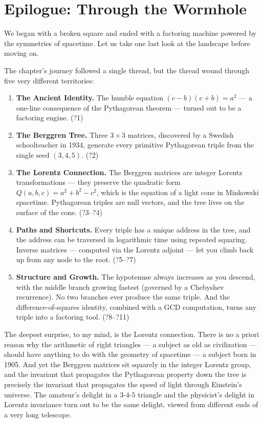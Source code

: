 \bigskip


\section{Epilogue: Through the Wormhole}

We began with a broken square and ended with a factoring machine powered by the symmetries of spacetime. Let us take one last look at the landscape before moving on.

The chapter's journey followed a single thread, but the thread wound through five very different territories:

\begin{enumerate}
\item \textbf{The Ancient Identity.} The humble equation $(c - b)(c + b) = a^2$ --- a one-line consequence of the Pythagorean theorem --- turned out to be a factoring engine. (?1)
\item \textbf{The Berggren Tree.} Three $3 \times 3$ matrices, discovered by a Swedish schoolteacher in 1934, generate every primitive Pythagorean triple from the single seed $(3, 4, 5)$. (?2)
\item \textbf{The Lorentz Connection.} The Berggren matrices are integer Lorentz transformations --- they preserve the quadratic form $Q(a, b, c) = a^2 + b^2 - c^2$, which is the equation of a light cone in Minkowski spacetime. Pythagorean triples are null vectors, and the tree lives on the surface of the cone. (?3--?4)
\item \textbf{Paths and Shortcuts.} Every triple has a unique address in the tree, and the address can be traversed in logarithmic time using repeated squaring. Inverse matrices --- computed via the Lorentz adjoint --- let you climb back up from any node to the root. (?5--?7)
\item \textbf{Structure and Growth.} The hypotenuse always increases as you descend, with the middle branch growing fastest (governed by a Chebyshev recurrence). No two branches ever produce the same triple. And the difference-of-squares identity, combined with a GCD computation, turns any triple into a factoring tool. (?8--?11)
\end{enumerate}
The deepest surprise, to my mind, is the Lorentz connection. There is no a priori reason why the arithmetic of right triangles --- a subject as old as civilization --- should have anything to do with the geometry of spacetime --- a subject born in 1905. And yet the Berggren matrices sit squarely in the integer Lorentz group, and the invariant that propagates the Pythagorean property down the tree is precisely the invariant that propagates the speed of light through Einstein's universe. The amateur's delight in a $3$-$4$-$5$ triangle and the physicist's delight in Lorentz invariance turn out to be the same delight, viewed from different ends of a very long telescope.

